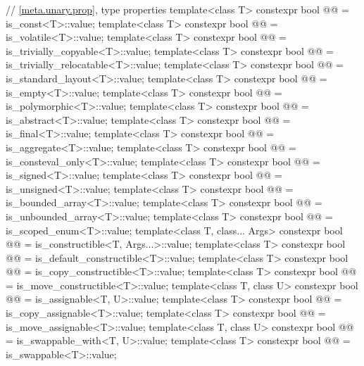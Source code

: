 \begin{codeblock}
{  // \ref{meta.unary.prop}, type properties
  template<class T>
    constexpr bool @@ = is_const<T>::value;
  template<class T>
    constexpr bool @@ = is_volatile<T>::value;
  template<class T>
    constexpr bool @@ = is_trivially_copyable<T>::value;
  template<class T>
    constexpr bool @@ = is_trivially_relocatable<T>::value;
  template<class T>
    constexpr bool @@ = is_standard_layout<T>::value;
  template<class T>
    constexpr bool @@ = is_empty<T>::value;
  template<class T>
    constexpr bool @@ = is_polymorphic<T>::value;
  template<class T>
    constexpr bool @@ = is_abstract<T>::value;
  template<class T>
    constexpr bool @@ = is_final<T>::value;
  template<class T>
    constexpr bool @@ = is_aggregate<T>::value;
  template<class T>
    constexpr bool @@ = is_consteval_only<T>::value;
  template<class T>
    constexpr bool @@ = is_signed<T>::value;
  template<class T>
    constexpr bool @@ = is_unsigned<T>::value;
  template<class T>
    constexpr bool @@ = is_bounded_array<T>::value;
  template<class T>
    constexpr bool @@ = is_unbounded_array<T>::value;
  template<class T>
    constexpr bool @@ = is_scoped_enum<T>::value;
  template<class T, class... Args>
    constexpr bool @@ = is_constructible<T, Args...>::value;
  template<class T>
    constexpr bool @@ = is_default_constructible<T>::value;
  template<class T>
    constexpr bool @@ = is_copy_constructible<T>::value;
  template<class T>
    constexpr bool @@ = is_move_constructible<T>::value;
  template<class T, class U>
    constexpr bool @@ = is_assignable<T, U>::value;
  template<class T>
    constexpr bool @@ = is_copy_assignable<T>::value;
  template<class T>
    constexpr bool @@ = is_move_assignable<T>::value;
  template<class T, class U>
    constexpr bool @@ = is_swappable_with<T, U>::value;
  template<class T>
    constexpr bool @@ = is_swappable<T>::value;
}
\end{codeblock}
